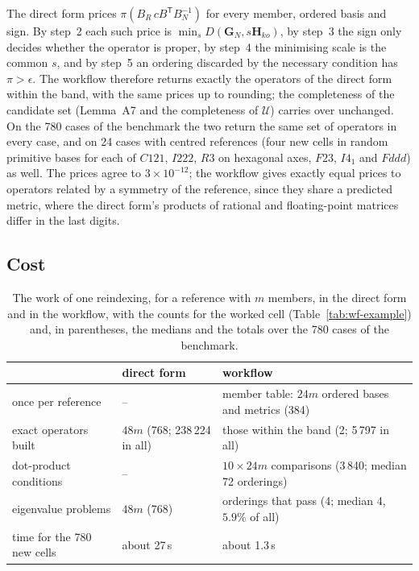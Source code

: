\documentclass[preprint,pdf]{iucr}          %
\newcommand{\Gmet}{\mathbf{G}}
\newcommand{\dist}{D}
\begin{document}
The direct form prices $\pi(B_R\,cB^{\mathsf T}B_N^{-1})$ for every member, ordered basis and sign. By step~2 each such price is $\min_s\dist(\Gmet_N,s\mathbf H_{ko})$, by step~3 the sign only decides whether the operator is proper, by step~4 the minimising scale is the common $s$, and by step~5 an ordering discarded by the necessary condition has $\pi>\epsilon$. The workflow therefore returns exactly the operators of the direct form within the band, with the same prices up to rounding; the completeness of the candidate set (Lemma~A7 and the completeness of $\mathcal U$) carries over unchanged. On the 780 cases of the benchmark the two return the same set of operators in every case, and on 24 cases with centred references (four new cells in random primitive bases for each of $C121$, $I222$, $R3$ on hexagonal axes, $F23$, $I4_1$ and $Fddd$) as well. The prices agree to $3\times10^{-12}$; the workflow gives exactly equal prices to operators related by a symmetry of the reference, since they share a predicted metric, where the direct form's products of rational and floating-point matrices differ in the last digits.

\subsection{Cost}

\begin{table}
\caption{The work of one reindexing, for a reference with $m$ members, in the direct form and in the workflow, with the counts for the worked cell (Table~\ref{tab:wf-example}) and, in parentheses, the medians and the totals over the 780 cases of the benchmark.}
\label{tab:wf-cost}
\begin{footnotesize}
\begin{tabular}{>{\raggedright\arraybackslash}p{4.4cm}>{\raggedright\arraybackslash}p{3.8cm}>{\raggedright\arraybackslash}p{5.6cm}}
\toprule
 & direct form & workflow \\
\midrule
once per reference & -- & member table: $24m$ ordered bases and metrics (384) \\
exact operators built & $48m$ (768; 238\,224 in all) & those within the band (2; 5\,797 in all) \\
dot-product conditions & -- & $10\times24m$ comparisons (3\,840; median 72 orderings) \\
eigenvalue problems & $48m$ (768) & orderings that pass (4; median 4, $5.9\%$ of all) \\
time for the 780 new cells & about 27\,s & about 1.3\,s \\
\bottomrule
\end{tabular}
\end{footnotesize}
\end{table}
\end{document}
